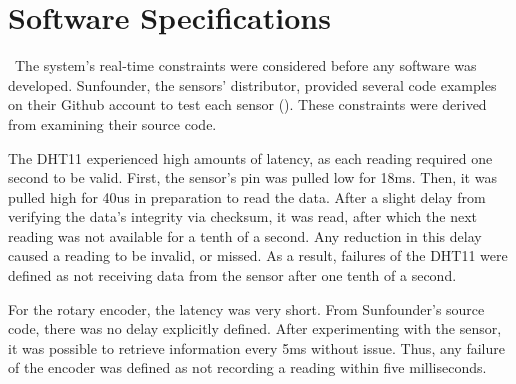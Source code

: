 \documentclass[letterpaper, 12pt]{article}
\begin{document}
\section{Software Specifications}
~\indent The system's real-time constraints were considered before any software was developed.  Sunfounder, the sensors' distributor, provided several code examples on their Github account to test each sensor (\cite{sunfounder2018}).  These constraints were derived from examining their source code.
  
\indent The DHT11 experienced high amounts of latency, as each reading required one second to be valid.  First, the sensor's pin was pulled low for 18ms. Then, it was pulled high for 40us in preparation to read the data.  After a slight delay from verifying the data's integrity via checksum, it was read, after which the next reading was not available for a tenth of a second.  Any reduction in this delay caused a reading to be invalid, or missed.  As a result, failures of the DHT11 were defined as not receiving data from the sensor after one tenth of a second.

\indent For the rotary encoder, the latency was very short.  From Sunfounder's source code, there was no delay explicitly defined.  After experimenting with the sensor, it was possible to retrieve information every 5ms without issue.  Thus, any failure of the encoder was defined as not recording a reading within five milliseconds.
\end{document}
